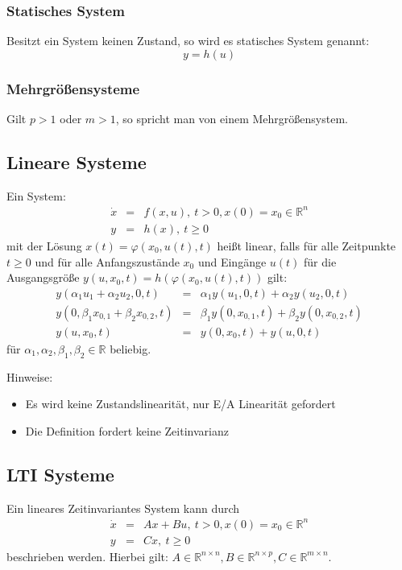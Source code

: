 \subsubsection{Statisches System}
Besitzt ein System keinen Zustand, so wird es statisches System genannt:
\begin{equation}
    y = h(u)
\end{equation}

\subsubsection{Mehrgrößensysteme}
Gilt $p>1$ oder $m>1$, so spricht man von einem Mehrgrößensystem.

\subsection{Lineare Systeme}
Ein System:
\begin{eqnarray}
    \dot{x} &=& f(x, u),\ t>0, x(0)=x_0 \in \mathbb{R}^n \\
    y &=& h(x),\ t\geq 0
\end{eqnarray}
mit der Lösung $x(t) = \varphi(x_0, u(t), t)$ heißt linear, falls für alle Zeitpunkte
$t \geq 0$ und für alle Anfangszustände $x_0$ und Eingänge $u(t)$ für die
Ausgangsgröße $y(u, x_0, t) = h(\varphi(x_0, u(t), t))$ gilt:
\begin{eqnarray}
    y(\alpha_1 u_1 + \alpha_2 u_2, 0, t) &=& \alpha_1 y(u_1, 0, t) + \alpha_2 y(u_2, 0, t) \\
    y(0, \beta_1 x_{0,1} + \beta_2 x_{0,2}, t) &=& \beta_1 y(0, x_{0,1},t) + \beta_2 y(0, x_{0,2}, t) \\
    y(u, x_0, t) &=& y(0, x_0, t) + y(u, 0, t)
\end{eqnarray}
für $\alpha_1, \alpha_2, \beta_1, \beta_2 \in \mathbb{R}$ beliebig.

Hinweise:
\begin{itemize}
    \item Es wird keine Zustandslinearität, nur E/A Linearität gefordert
    \item Die Definition fordert keine Zeitinvarianz
\end{itemize}

\subsection{LTI Systeme}
Ein lineares Zeitinvariantes System kann durch
\begin{eqnarray}
    \dot{x} &=& Ax + Bu,\ t>0, x(0) = x_0 \in \mathbb{R}^n \\
    y &=& C x,\ t \geq 0 
\end{eqnarray}
beschrieben werden. Hierbei gilt: $A \in \mathbb{R}^{n \times n}, B \in \mathbb{R}^{n \times p}, C \in \mathbb{R}^{m \times n}$.


